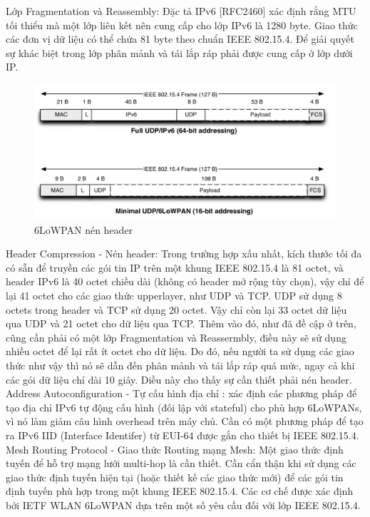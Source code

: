 \documentclass{report}
\begin{document}
Lớp Fragmentation và Reassembly: Đặc tả IPv6 [RFC2460] xác định rằng MTU tối thiểu mà
một lớp liên kết nên cung cấp cho lớp IPv6 là 1280 byte. Giao thức các đơn vị dữ liệu có thể chứa 81 byte theo chuẩn IEEE 802.15.4. Để giải quyết sự khác biệt trong lớp phân mảnh và
tái lắp ráp phải được cung cấp ở lớp dưới IP. \\
\begin{figure}[h]
	\centering
	\includegraphics[scale = 0.7]{fig26.png}
	\caption{6LoWPAN nén header}
	\label{fig:Graph26}
\end{figure}

Header Compression - Nén header: Trong trường hợp xấu nhất, kích thước tối đa có sẵn
để truyền các gói tin IP trên một khung IEEE 802.15.4 là 81 octet, và header IPv6 là 40
octet chiều dài (không có header mở rộng tùy chọn), vậy chỉ để lại 41 octet cho các giao thức
upperlayer, như UDP và TCP. UDP sử dụng 8 octets trong header và TCP sử dụng 20 octet.
Vậy chỉ còn lại 33 octet dữ liệu qua UDP và 21 octet cho dữ liệu qua TCP. Thêm vào đó, như
đã đề cập ở trên, cũng cần phải có một lớp Fragmentation và Reassermbly, điều này sẽ sử dụng
nhiều octet để lại rất ít octet cho dữ liệu. Do đó, nếu người ta sử dụng các giao thức như vậy
thì nó sẽ dẫn đến phân mảnh và tái lắp ráp quá mức, ngay cả khi các gói dữ liệu chỉ dài 10
giây. Diều này cho thấy sự cần thiết phải nén header. \\

Address Autoconfiguration - Tự cấu hình địa chỉ : xác định các phương pháp để tạo địa
chỉ IPv6 tự động cấu hình (đối lập với stateful) cho phù hợp 6LoWPANs, vì nó làm
giảm câu hình overhead trên máy chủ. Cần có một phương pháp để tạo ra IPv6 IID (Interface
Identifer) từ EUI-64 được gắn cho thiết bị IEEE 802.15.4. \\

Mesh Routing Protocol - Giao thức Routing mạng Mesh: Một giao thức định tuyến để hỗ
trợ mạng lưới multi-hop là cần thiết. Cần cẩn thận khi sử dụng các giao thức định tuyến hiện
tại (hoặc thiết kế các giao thức mới) để các gói tin định tuyến phù hợp trong một khung IEEE
802.15.4. Các cơ chế được xác định bởi IETF WLAN 6LoWPAN dựa trên một số yêu cầu đối
với lớp IEEE 802.15.4. \\
\end{document}
